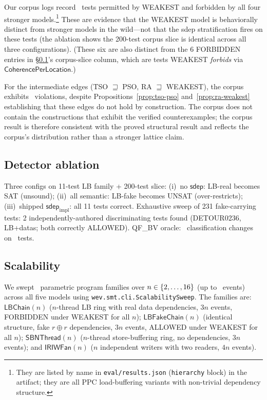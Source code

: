 \documentclass{llncs}
\newcommand{\sdep}{\mathsf{sdep}}
\newcommand{\sdepimpl}{\mathsf{sdep}_{\mathrm{impl}}}
\begin{document}
Our corpus logs record \WeakestOnlyAllowed~tests permitted by WEAKEST and forbidden by all four stronger models.\footnote{They are listed by name in \texttt{eval/results.json} (\texttt{hierarchy} block) in the artifact; they are all PPC load-buffering variants with non-trivial dependency structure.} These are evidence that the WEAKEST model is behaviorally distinct from stronger models in the wild---not that the sdep stratification fires on these tests (the ablation shows the 200-test corpus slice is identical across all three configurations). (These six are also distinct from the 6 FORBIDDEN entries in \S\ref{sec:ablation}'s corpus-slice column, which are tests WEAKEST \emph{forbids} via $\mathsf{CoherencePerLocation}$.)

For the intermediate edges (TSO $\sqsupseteq$ PSO, RA $\sqsupseteq$ WEAKEST),
the corpus exhibits \HierarchyIntermediateViolations~violations, despite
Propositions~\ref{prop:tso-pso} and~\ref{prop:ra-weakest} establishing that
these edges do not hold by construction. The corpus does not contain the
constructions that exhibit the verified counterexamples; the corpus result is
therefore consistent with the proved structural result and reflects the
corpus's distribution rather than a stronger lattice claim.

\subsection{Detector ablation}
\label{sec:ablation}

Three configs on 11-test LB family + 200-test slice:
(i)~no $\sdep$: LB-real becomes SAT (unsound);
(ii)~all semantic: LB-fake becomes UNSAT (over-restricts);
(iii)~shipped $\sdepimpl$: all 11 tests correct.
Exhaustive sweep of 231 fake-carrying tests: 2 independently-authored
discriminating tests found (DETOUR0236, LB+datas; both correctly ALLOWED).
QF\_BV oracle: \QfbvChanged~classification changes on \QfbvTests~tests.

\subsection{Scalability}
\label{sec:scalability}

We swept \ScalabilityFamilies~parametric program families over
$n \in \{2,\ldots,16\}$
(up to \ScalabilityMaxEvents~events) across all five models using
\texttt{wev.smt.cli.ScalabilitySweep}. The families are:
$\mathsf{LBChain}(n)$ ($n$-thread LB ring with real data dependencies,
$3n$ events, FORBIDDEN under WEAKEST for all $n$);
$\mathsf{LBFakeChain}(n)$ (identical structure, fake $r \oplus r$
dependencies, $3n$ events, ALLOWED under WEAKEST for all $n$);
$\mathsf{SBNThread}(n)$ ($n$-thread store-buffering ring, no
dependencies, $3n$ events); and $\mathsf{IRIWFan}(n)$ ($n$ independent
writers with two readers, $4n$ events).
\end{document}
